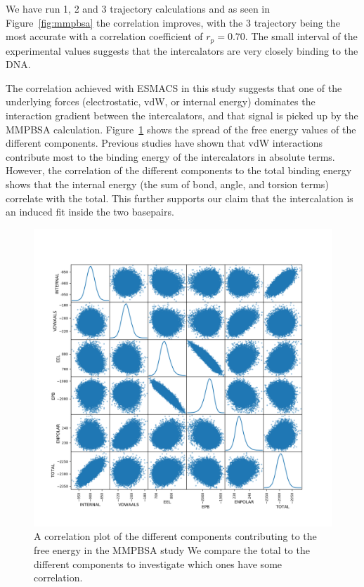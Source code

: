 We have run 1, 2 and 3 trajectory calculations and as seen in Figure~\ref{fig:mmpbsa} the correlation improves, with the 3 trajectory being the most accurate with a correlation coefficient of $r_p=0.70$. The small interval of the experimental values suggests that the intercalators are very closely binding to the DNA. 

The correlation achieved with ESMACS in this study suggests that one of the underlying forces (electrostatic, vdW, or internal energy) dominates the interaction gradient between the intercalators, and that signal is picked up by the MMPBSA calculation. Figure~\ref{fig:corrmat} shows the spread of the free energy values of the different components. Previous studies \cite{galindo2017computational} have shown that vdW interactions contribute most to the binding energy of the intercalators in absolute terms. However, the correlation of the different components to the total binding energy shows that the internal energy (the sum of bond, angle, and torsion terms) correlate with the total. This further supports our claim that the intercalation is an induced fit inside the two basepairs.

\begin{figure}
  \includegraphics[width=\columnwidth]{components}
  \caption{A correlation plot of the different components contributing to the free energy in the MMPBSA study We compare the total to the different components to investigate which ones have some correlation.}
  \label{fig:corrmat}
\end{figure}

